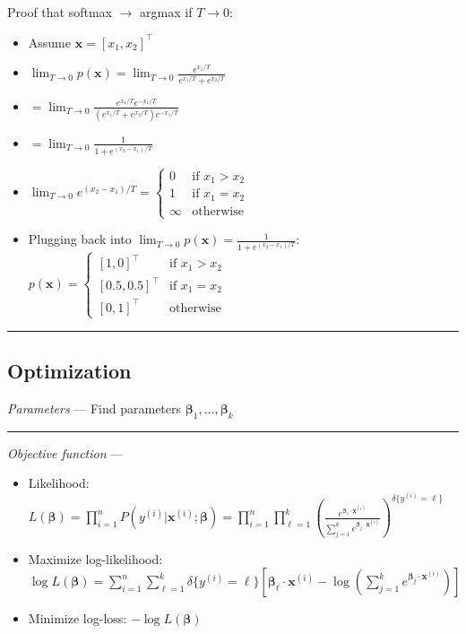 Proof that softmax $\to$ argmax if $T \to 0$:
\begin{itemize}
    \item Assume $\boldsymbol{x} = [x_1, x_2]^\intercal$
    \item $\lim_{T \to 0} p(\boldsymbol{x}) = \lim_{T \to 0} \frac{e^{x_1 / T}}{e^{x_1 / T} + e^{x_2 / T}}$
    \item $= \lim_{T \to 0} \frac{e^{x_1 / T}e^{-x_1 / T}}{(e^{x_1 / T} + e^{x_2 / T})e^{-x_1 / T}}$
    \item $= \lim_{T \to 0} \frac{1}{1 + e^{(x_2 - x_1) / T}}$
    \item $\lim_{T \to 0} e^{(x_2 - x_1) / T} =
  \begin{cases}
    0 & \textrm{if } x_1 > x_2 \\
    1 & \textrm{if } x_1 = x_2 \\
    \infty & \textrm{otherwise}
  \end{cases}$
  \item Plugging back into $\lim_{T \to 0} p(\boldsymbol{x}) =\frac{1}{1 + e^{(x_2 - x_1) / T}}$:
  $
  p(\boldsymbol{x}) =
  \begin{cases}
    [1, 0]^\intercal & \textrm{if } x_1 > x_2 \\
    [0.5, 0.5]^\intercal & \textrm{if } x_1 = x_2\\
    [0, 1]^\intercal & \textrm{otherwise}
  \end{cases}
  $ 
\end{itemize}

{\color{black}\hrule height 0.001mm}

\subsection*{Optimization}
\emph{Parameters} --- Find parameters $\boldsymbol{\beta}_1, \dots, \boldsymbol{\beta}_k$

{\color{lightgray}\hrule height 0.001mm}

\emph{Objective function} --- 
\begin{itemize}
    \item Likelihood: 
    $
    L(\boldsymbol{\beta}) = \prod_{i=1}^n P(y^{(i)} | \boldsymbol{x}^{(i)}; \boldsymbol{\beta})
    = \prod_{i=1}^n \prod_{\ell=1}^k ( \frac{e^{\boldsymbol{\beta}_{\ell} \cdot \boldsymbol{x}^{(i)}}}{\sum_{j=1}^k e^{\boldsymbol{\beta}_j \cdot \boldsymbol{x}^{(i)}}} )^{\delta\{y^{(i)} = \ell\}}
    $
    \item Maximize log-likelihood:
    $
    \log L(\boldsymbol{\beta}) = \sum_{i=1}^n \sum_{\ell=1}^k \delta\{y^{(i)} = \ell\} [ \boldsymbol{\beta}_{\ell} \cdot \boldsymbol{x}^{(i)} - \log ( \sum_{j=1}^k e^{\boldsymbol{\beta}_j \cdot \boldsymbol{x}^{(i)}} ) ]
    $
    \item Minimize log-loss:
    $
    -\log L(\boldsymbol{\beta})
    $
\end{itemize}

